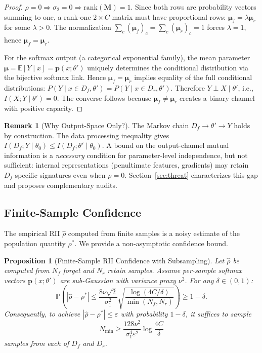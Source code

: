 \documentclass[journal]{IEEEtran}
\newtheorem{proposition}[theorem]{Proposition}
\theoremstyle{definition}
\newtheorem{remark}[theorem]{Remark}
\begin{document}
\begin{proof}
$\rho = 0 \Rightarrow \sigma_2 = 0 \Rightarrow \mathrm{rank}(\mathbf{M}) = 1$. Since both rows are probability vectors summing to one, a rank-one $2\times C$ matrix must have proportional rows: $\boldsymbol{\mu}_f = \lambda \boldsymbol{\mu}_r$ for some $\lambda > 0$. The normalization $\sum_c (\boldsymbol{\mu}_f)_c = \sum_c (\boldsymbol{\mu}_r)_c = 1$ forces $\lambda = 1$, hence $\boldsymbol{\mu}_f = \boldsymbol{\mu}_r$.

For the softmax output (a categorical exponential family), the mean parameter $\boldsymbol{\mu} = \mathbb{E}[Y\mid x] = \mathbf{p}(x;\theta')$ uniquely determines the conditional distribution via the bijective softmax link. Hence $\boldsymbol{\mu}_f = \boldsymbol{\mu}_r$ implies equality of the full conditional distributions: $P(Y\mid x\in D_f, \theta') = P(Y\mid x\in D_r, \theta')$. Therefore $Y \perp X \mid \theta'$, i.e., $I(X; Y \mid \theta') = 0$. The converse follows because $\boldsymbol{\mu}_f \neq \boldsymbol{\mu}_r$ creates a binary channel with positive capacity.
\end{proof}

\begin{remark}[Why Output-Space Only?]
The Markov chain $D_f \to \theta' \to Y$ holds by construction. The data processing inequality gives $I(D_f; Y \mid \theta_0) \le I(D_f; \theta' \mid \theta_0)$. A bound on the output-channel mutual information is a \emph{necessary} condition for parameter-level independence, but not sufficient: internal representations (penultimate features, gradients) may retain $D_f$-specific signatures even when $\rho=0$. Section~\ref{sec:threat} characterizes this gap and proposes complementary audits.
\end{remark}

\subsection{Finite-Sample Confidence}

The empirical RII $\hat{\rho}$ computed from finite samples is a noisy estimate of the population quantity $\rho^*$. We provide a non-asymptotic confidence bound.

\begin{proposition}[Finite-Sample RII Confidence with Subsampling]
\label{prop:confidence}
Let $\hat{\rho}$ be computed from $N_f$ forget and $N_r$ retain samples. Assume per-sample softmax vectors $\mathbf{p}(x;\theta')$ are sub-Gaussian with variance proxy $\nu^2$. For any $\delta \in (0,1)$:
\begin{equation}
\mathbb{P}\!\left(|\hat{\rho} - \rho^*| \le \frac{8\nu\sqrt{2}}{\sigma_1^2}\sqrt{\frac{\log(4C/\delta)}{\min(N_f, N_r)}}\right) \ge 1 - \delta.
\end{equation}
Consequently, to achieve $|\hat{\rho}-\rho^*| \le \varepsilon$ with probability $1-\delta$, it suffices to sample
\begin{equation}
\boxed{N_{\min} \ge \frac{128\nu^2}{\sigma_1^4\varepsilon^2}\log\frac{4C}{\delta}}
\label{eq:subsample}
\end{equation}
samples from each of $D_f$ and $D_r$.
\end{proposition}
\end{document}
